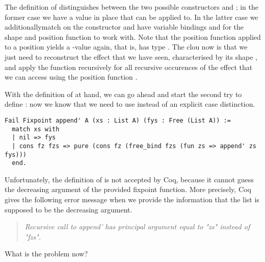 The definition of  distinguishes between the two
possible constructors  and ; in the former
case we have a value  in place that  can be applied
to.
In the latter case we additionallymatch on the constructor 
and have variable bindings  and  for the shape and
position function to work with.
Note that the position function applied to a position
yields a -value again, that is,  has type
.
The clou now is that we just need to reconstruct the effect that we
have seen, characterised by its shape , and apply the function
 recursively for all recursive occurences of the effect that
we can access using the position function .

With the definition of  at hand, we can go ahead and
start the second try to define : now we know that we need
to use  instead of an explicit case distinction.

\begin{verbatim}
Fail Fixpoint append' A (xs : List A) (fys : Free (List A)) :=
  match xs with
  | nil => fys
  | cons fz fzs => pure (cons fz (free_bind fzs (fun zs => append' zs fys)))
  end.
\end{verbatim}

Unfortunately, the definition of  is not accepted by
Coq, because it cannot guess the decreasing argument of the provided
fixpoint function.
More precisely, Coq gives the following error message when we
provide the information that the list  is supposed to be the
decreasing argument.

\begin{quote}
\emph{Recursive call to append' has principal argument equal to "zs" instead of
"fzs".}
\end{quote}

What is the problem now?

